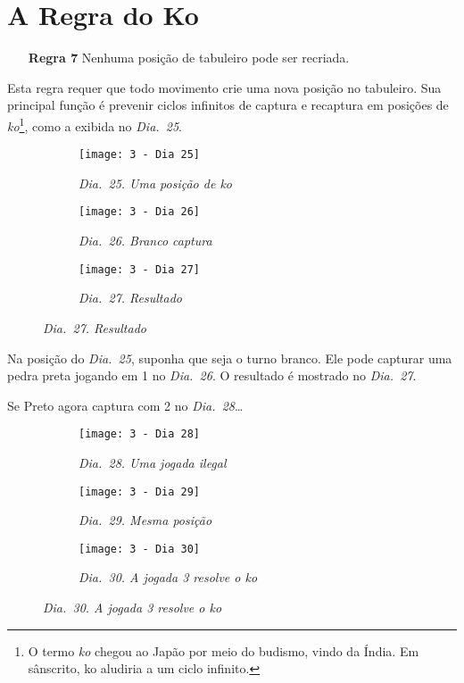 \chapter{A Regra do Ko}

\begin{itemize}
  \item[\textbf{Regra 7}] Nenhuma posição de tabuleiro pode ser recriada.
\end{itemize}

Esta regra requer que todo movimento crie uma nova posição no tabuleiro. Sua principal função é prevenir ciclos infinitos de captura e recaptura em posições de \emph{ko}\footnote{O termo \emph{ko} chegou ao Japão por meio do budismo, vindo da Índia. Em sânscrito, ko aludiria a um ciclo infinito.}, como a exibida no \emph{Dia.\@~25}.

\begin{figure}[h]
  \centering
  \begin{subfigure}[t]{.3\textwidth}
      \centering
      \texttt{[image: 3 - Dia 25]}
      \caption*{\emph{Dia.\@~25. Uma posição de ko}}
  \end{subfigure}
  \hfill
  \begin{subfigure}[t]{.3\textwidth}
      \centering
      \texttt{[image: 3 - Dia 26]}
      \caption*{\emph{Dia.\@~26. Branco captura}}
  \end{subfigure}
  \hfill
  \begin{subfigure}[t]{.3\textwidth}
      \centering
      \texttt{[image: 3 - Dia 27]}
      \caption*{\emph{Dia.\@~27. Resultado}}
  \end{subfigure}
\end{figure}

Na posição do \emph{Dia.\@~25}, suponha que seja o turno branco. Ele pode capturar uma pedra preta jogando em 1 no \emph{Dia.\@~26}. O resultado é mostrado no \emph{Dia.\@~27}.

Se Preto agora captura com 2 no \emph{Dia.\@~28}\ldots

\pagebreak

\begin{figure}[h]
  \centering
  \begin{subfigure}[t]{.3\textwidth}
      \centering
      \texttt{[image: 3 - Dia 28]}
      \caption*{\emph{Dia.\@~28. Uma jogada ilegal}}
  \end{subfigure}
  \begin{subfigure}[t]{.3\textwidth}
      \centering
      \texttt{[image: 3 - Dia 29]}
      \caption*{\emph{Dia.\@~29. Mesma posição}}
  \end{subfigure}
  \begin{subfigure}[t]{.3\textwidth}
      \centering
      \texttt{[image: 3 - Dia 30]}
      \caption*{\emph{Dia.\@~30. A jogada 3 resolve o ko}}
  \end{subfigure}
\end{figure}

